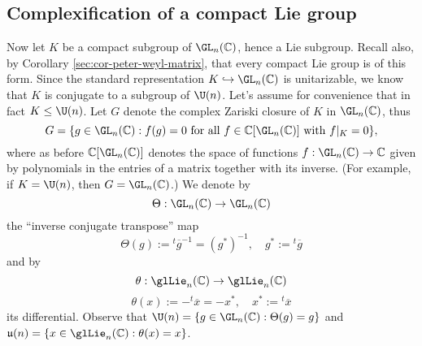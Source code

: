 \documentclass[reqno]{amsart} 
\begin{document}
\subsection{Complexification of a compact Lie group}
Now let $K$ be a compact subgroup of $\GL_n(\mathbb{C})$, hence a Lie subgroup.  Recall also, by Corollary \ref{sec:cor-peter-weyl-matrix}, that every compact Lie group is of this form.  Since the standard representation $K \hookrightarrow \GL_n(\mathbb{C})$ is unitarizable, we know that $K$ is conjugate to a subgroup of $\U(n)$.  Let's assume for convenience that in fact $K \leq \U(n)$.  Let $G$ denote the complex Zariski closure of $K$ in $\GL_n(\mathbb{C})$, thus
\begin{equation*}
  G = \{g \in \GL_n(\mathbb{C}) : f(g) = 0 \text{ for all } f \in \mathbb{C}[\GL_n(\mathbb{C})] \text{ with } f|_K = 0 \},
\end{equation*}
where as before $\mathbb{C}[\GL_n(\mathbb{C})]$ denotes the space of functions $f : \GL_n (\mathbb{C} ) \rightarrow \mathbb{C}$ given by polynomials in the entries of a matrix together with its inverse.  (For example, if $K = \U(n)$, then $G = \GL_n(\mathbb{C})$.)  We denote by
\begin{equation*}
  \Theta : \GL_n(\mathbb{C}) \rightarrow \GL_n(\mathbb{C})
\end{equation*}
the ``inverse conjugate transpose'' map
\begin{equation*}
  \Theta(g) := {}^t \overline{g}^{-1} = (g^*)^{-1}, \quad g^* := {}^t \overline{g}
\end{equation*}
and by
\begin{equation*}
  \theta : \glLie_n(\mathbb{C}) \rightarrow \glLie_n(\mathbb{C})
\end{equation*}
\begin{equation*}
  \theta(x) := - {}^t \overline{x} = - x^*, \quad x^* := {}^t \overline{x}
\end{equation*}
its differential.  Observe that $\U(n) = \{ g \in \GL_n(\mathbb{C}) : \Theta(g) = g\}$ and $\mathfrak{u}(n) = \{ x \in \glLie_n(\mathbb{C}) : \theta(x) = x\}$.
\end{document}
